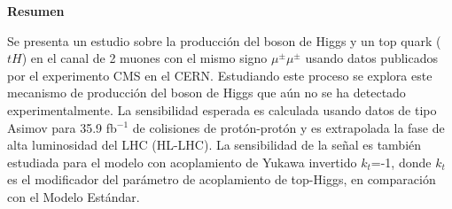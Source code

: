 
\thispagestyle{empty}
 \vspace*{2.2cm}
\begin{center}
\Large \textbf{Resumen}
\end{center} 
\vspace{1.5cm}

Se presenta un estudio sobre la producci\'on del boson de Higgs y un top quark ($tH$) en el canal de 2 muones con el mismo signo $\mu^\pm \mu^\pm$ usando datos publicados por el experimento CMS en el CERN.
Estudiando este proceso se explora este mecanismo de producci\'on del boson de Higgs que a\'un no se ha detectado experimentalmente.
La sensibilidad esperada es calculada usando  datos de tipo Asimov para 35.9 fb$^{-1}$ de colisiones de prot\'on-prot\'on y es extrapolada la fase de alta luminosidad del LHC (HL-LHC).
La sensibilidad de la se\~nal es tambi\'en estudiada para el modelo con acoplamiento de Yukawa invertido $k_t$=-1, donde $k_t$ es el modificador del par\'ametro de acoplamiento de top-Higgs, en comparaci\'on con el Modelo Est\'andar.
